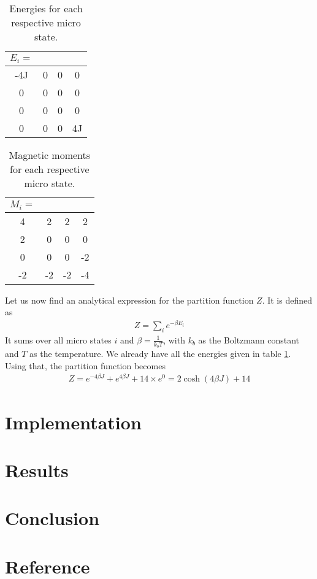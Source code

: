 \documentclass[12pt]{article}
\begin{document}
\begin{table}
\begin{center}
	\begin{tabular}{c c c c}
	$E_i =$& & &\\
	\hline
	-4J& 0& 0& 0\\
	0&0 &0 & 0\\
	0& 0& 0& 0\\
	0&0 & 0& 4J\\
	\hline
	\end{tabular}
\caption{Energies for each respective micro state.}
\label{table:All_energies}
\end{center}
\end{table}

\begin{table}
\begin{center}
	\begin{tabular}{c c c c}
	$M_i = $& & & \\
	\hline
	4& 2& 2& 2\\
	2&0 &0 & 0\\
	0& 0& 0& -2\\
	-2&-2 & -2& -4\\
	\hline
	\end{tabular}
\caption{Magnetic moments for each respective micro state.}
\label{table:All_magnetic_moment}
\end{center}
\end{table}

Let us now find an analytical expression for the partition function $Z$. It is defined as
\begin{align*}
Z = \displaystyle \sum_i e^{-\beta E_i}
\end{align*}
It sums over all micro states $i$ and $\beta = \frac{1}{k_bT}$, with $k_b$ as the Boltzmann constant and $T$ as the temperature. We already have all the energies given in table \ref{table:All_energies}. Using that, the partition function becomes
\begin{align*}
Z = e^{-4\beta J} + e^{4\beta J} + 14\times e^{0} = 2\cosh(4 \beta J) + 14
\end{align*}

\FloatBarrier
\section*{Implementation}
\section*{Results}
\section*{Conclusion}
\section*{Reference}
\end{document}
